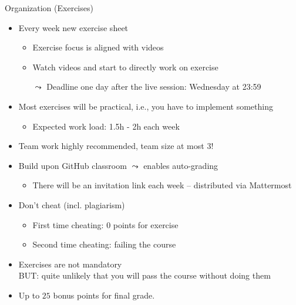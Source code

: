 \documentclass[aspectratio=169]{../latex_main/tntbeamer}  %
\begin{document}
\begin{frame}[c]{Organization (Exercises)}

\begin{itemize}
  \item Every week new exercise sheet
  \begin{itemize}
      \item Exercise focus is aligned with videos
      \item Watch videos and start to directly work on exercise 
      \item[$\leadsto$] \alert{Deadline one day after the live session: Wednesday at 23:59}
  \end{itemize}
  \item Most exercises will be practical, i.e., you have to implement something
  \begin{itemize}
    \item Expected work load: 1.5h - 2h each week
  \end{itemize}
  \item Team work highly recommended, team size at most 3! 
  \item Build upon GitHub classroom $\leadsto$ enables auto-grading
  \begin{itemize}
      \item There will be an invitation link each week -- distributed via Mattermost
  \end{itemize}
  \pause
  \item Don't cheat (incl. plagiarism)
  \begin{itemize}
    \item First time cheating: $0$ points for exercise
    \item Second time cheating: failing the course
  \end{itemize}
  \pause
  \item Exercises are not mandatory\\ \alert{BUT: quite unlikely that you will pass the course without doing them}
  \pause
  \item Up to \alert{$25$ bonus points} for final grade.
\end{itemize}

\end{frame}
\end{document}
